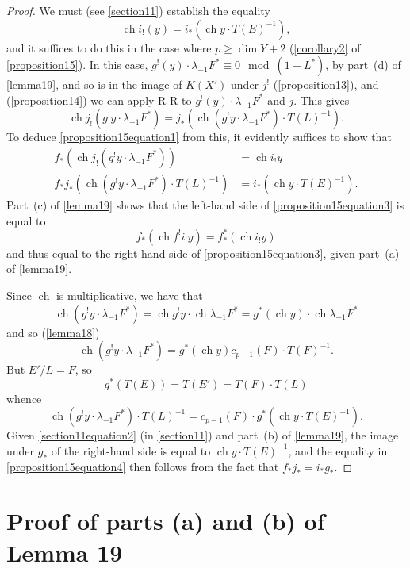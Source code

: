\documentclass{article}
\theoremstyle{plain}
\theoremstyle{definition}
\renewcommand{\geq}{\geqslant}
\DeclareMathOperator{\ch}{ch}
\begin{document}
\begin{proof}
  We must (see \cref{section11}) establish the equality
  \[
  \label{proposition15equation1}
    \ch i_!(y) = i_*(\ch y\cdot T(E)^{-1}),
    \tag{1}
  \]
  and it suffices to do this in the case where $p\geq\dim Y+2$ (\cref{corollary2} of \cref{proposition15}).
  In this case, $g^!(y)\cdot\lambda_{-1}F^*\equiv0\mod(1-L^*)$, by part~(d) of \cref{lemma19}, and so is in the image of $K(X')$ under $j^!$ (\cref{proposition13}), and (\cref{proposition14}) we can apply \hyperref[theoremriemannroch]{R-R} to $g^!(y)\cdot\lambda_{-1}F^*$ and $j$.
  This gives
  \[
  \label{proposition15equation2}
    \ch j_!(g^! y\cdot\lambda_{-1}F^*)
    = j_*(\ch(g^! y\cdot \lambda_{-1}F^*)\cdot T(L)^{-1}).
    \tag{2}
  \]
  To deduce \cref{proposition15equation1} from this, it evidently suffices to show that
  \begin{align*}
  \label{proposition15equation3}
    f_*(\ch j_!(g^!y\cdot\lambda_{-1}F^*)) &= \ch i_! y
    \tag{3}
  \\
  \label{proposition15equation4}f_*j_*(\ch(g^!y\cdot\lambda_{-1}F^*)\cdot T(L)^{-1}) &= i_*(\ch y\cdot T(E)^{-1}).
    \tag{4}
  \end{align*}
  Part~(c) of \cref{lemma19} shows that the left-hand side of \cref{proposition15equation3} is equal to
  \[
    f_*(\ch f^!i_!y) = f_*^*(\ch i_!y)
  \]
  and thus equal to the right-hand side of \cref{proposition15equation3}, given part~(a) of \cref{lemma19}.

  Since $\ch$ is multiplicative, we have that
  \[
    \ch(g^!y\cdot\lambda_{-1}F^*)
    = \ch g^!y\cdot\ch\lambda_{-1}F^*
    = g^*(\ch y)\cdot\ch\lambda_{-1}F^*
  \]
  and so (\cref{lemma18})
  \[
    \ch(g^!y\cdot\lambda_{-1}F^*) = g^*(\ch y)c_{p-1}(F)\cdot T(F)^{-1}.
  \]
  But $E'/L=F$, so
  \[
    g^*(T(E)) = T(E') = T(F)\cdot T(L)
  \]
  whence
  \[
    \ch(g^!y\cdot\lambda_{-1}F^*)\cdot T(L)^{-1} = c_{p-1}(F)\cdot g^*(\ch y\cdot T(E)^{-1}).
  \]
  Given \cref{section11equation2} (in \cref{section11}) and part~(b) of \cref{lemma19}, the image under $g_*$ of the right-hand side is equal to $\ch y\cdot T(E)^{-1}$, and the equality in \cref{proposition15equation4} then follows from the fact that $f_*j_*=i_*g_*$.
\end{proof}


\section{Proof of parts (a) and (b) of Lemma 19}
\label{section14}
\end{document}
